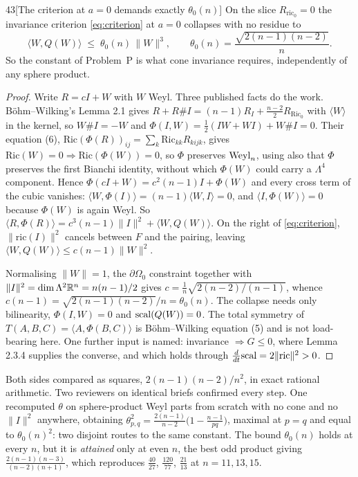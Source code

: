 \begin{Lem}{43}[The criterion at $a=0$ demands exactly $\theta_0(n)$]
On the slice $R_{\mathrm{ric}_0}=0$ the invariance criterion \eqref{eq:criterion} at $a=0$ collapses with no residue to
\[
\langle W,Q(W)\rangle\;\le\;\theta_0(n)\,\|W\|^3,\qquad \theta_0(n)=\frac{\sqrt{2(n-1)(n-2)}}n .
\]
So the constant of Problem~P is what cone invariance requires, independently of any sphere product.
\end{Lem}

\begin{proof}
Write $R=cI+W$ with $W$ Weyl. Three published facts do the work. B\"ohm--Wilking's Lemma 2.1 gives $R+R\#I=(n-1)R_I+\tfrac{n-2}2R_{\mathrm{Ric}_0}$ with $\langle W\rangle$ in the kernel, so $W\#I=-W$ and $\Phi(I,W)=\tfrac12(IW+WI)+W\#I=0$. Their equation (6), $\mathrm{Ric}(\Phi(R))_{ij}=\sum_k\mathrm{Ric}_{kk}R_{kijk}$, gives $\mathrm{Ric}(W)=0\Rightarrow\mathrm{Ric}(\Phi(W))=0$, so $\Phi$ preserves $\mathrm{Weyl}_n$, using also that $\Phi$ preserves the first Bianchi identity, without which $\Phi(W)$ could carry a $\Lambda^4$ component. Hence $\Phi(cI+W)=c^2(n-1)I+\Phi(W)$ and every cross term of the cubic vanishes: $\langle W,\Phi(I)\rangle=(n-1)\langle W,I\rangle=0$, and $\langle I,\Phi(W)\rangle=0$ because $\Phi(W)$ is again Weyl. So $\langle R,\Phi(R)\rangle=c^3(n-1)\|I\|^2+\langle W,Q(W)\rangle$. On the right of \eqref{eq:criterion}, $\|\mathrm{ric}(I)\|^2$ cancels between $F$ and the pairing, leaving $\langle W,Q(W)\rangle\le c(n-1)\|W\|^2$.

Normalising $\|W\|=1$, the $\partial\Omega_0$ constraint together with $\|I\|^2=\dim\Lambda^2\mathbb{R}^n=n(n-1)/2$ gives $c=\tfrac1n\sqrt{2(n-2)/(n-1)}$, whence $c(n-1)=\sqrt{2(n-1)(n-2)}/n=\theta_0(n)$. The collapse needs only bilinearity, $\Phi(I,W)=0$ and $\mathrm{scal}(Q(W))=0$. The total symmetry of $T(A,B,C)=\langle A,\Phi(B,C)\rangle$ is B\"ohm--Wilking equation (5) and is not load-bearing here. One further input is named: invariance $\Rightarrow G\le0$, where \cite{beitz2018} Lemma 2.3.4 supplies the converse, and which holds through $\tfrac d{dt}\mathrm{scal}=2\|\mathrm{ric}\|^2>0$.
\end{proof}

\begin{certificate}
Both sides compared as squares, $2(n-1)(n-2)/n^2$, in exact rational arithmetic. Two reviewers on identical briefs confirmed every step. One recomputed $\theta$ on sphere-product Weyl parts from scratch with no cone and no $\|I\|^2$ anywhere, obtaining $\theta_{p,q}^2=\tfrac{2(n-1)}{n-2}\big(1-\tfrac{n-1}{pq}\big)$, maximal at $p=q$ and equal to $\theta_0(n)^2$: two disjoint routes to the same constant. The bound $\theta_0(n)$ holds at every $n$, but it is \emph{attained} only at even $n$, the best odd product giving $\tfrac{2(n-1)(n-3)}{(n-2)(n+1)}$, which reproduces $\tfrac{40}{27}$, $\tfrac{120}{77}$, $\tfrac{21}{13}$ at $n=11,13,15$.
\end{certificate}

